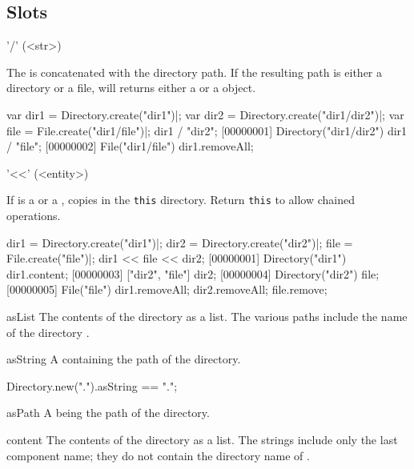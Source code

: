 \subsection{Slots}
\begin{urbiscriptapi}
\item['/'](<str>)
  \experimental{}

  The   is concatenated with the directory path.
  If the resulting path is either a directory or a file,  will
  returns either a  or a  object.
\begin{urbiscript}
var dir1 = Directory.create("dir1")|;
var dir2 = Directory.create("dir1/dir2")|;
var file = File.create("dir1/file")|;
dir1 / "dir2";
[00000001] Directory("dir1/dir2")
dir1 / "file";
[00000002] File("dir1/file")
dir1.removeAll;
\end{urbiscript}

\item['<<'](<entity>)
  \experimental{}

  If  is a  or a ,
   copies  in the \lstinline|this| directory.
  Return \lstinline|this| to allow chained operations.
\begin{urbiscript}
dir1 = Directory.create("dir1")|;
dir2 = Directory.create("dir2")|;
file = File.create("file")|;
dir1 << file << dir2;
[00000001] Directory("dir1")
dir1.content;
[00000003] ["dir2", "file"]
dir2;
[00000004] Directory("dir2")
file;
[00000005] File("file")
dir1.removeAll;
dir2.removeAll;
file.remove;
\end{urbiscript}

\item[asList]
  The contents of the directory as a  list.  The
  various paths include the name of the directory \this.

\item[asString] A  containing the path of the directory.
\begin{urbiassert}
Directory.new(".").asString == ".";
\end{urbiassert}

\item[asPath] A  being the path of the directory.

\item[content]
  The contents of the directory as a  list.  The
  strings include only the last component name; they do not contain
  the directory name of \this.


\end{urbiscriptapi}
